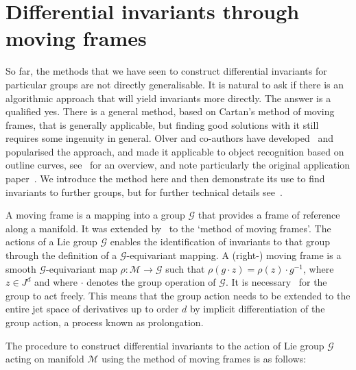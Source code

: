 \documentclass{artjlt}
\begin{document}
\section{Differential invariants through moving frames}\label{sec:movingframes}

So far, the methods that we have seen to construct differential invariants for particular groups are not directly generalisable. It is natural to ask if there is an algorithmic approach that will yield invariants more directly. The answer is a qualified yes. There is a general method, based on Cartan's method of moving frames, that is generally applicable, but finding good solutions with it still requires some ingenuity in general. Olver and co-authors have developed~\cite{Fels1999} and popularised the approach, and made it applicable to object recognition based on outline curves, see~\citet{Olver2005} for an overview, and note particularly the original application paper~\citep{Calabi1998}.  We introduce the method here and then demonstrate its use to find invariants to further groups, but for further technical details see~\citet{OlverCIT}. 

A moving frame is a mapping into a group $\mathcal{G}$ that provides a frame of reference along a manifold.  It was extended by~\citet{Cartan35} to the `method of moving frames'. The actions of a Lie group $\mathcal{G}$ enables the identification of invariants to that group through the definition of a $\mathcal{G}$-equivariant mapping. A (right-) moving frame is a smooth $\mathcal{G}$-equivariant map $\rho : \mathcal{M} \to \mathcal{G}$ such that $\rho (g \cdot z) = \rho(z) \cdot g^{-1}$, where $z \in J^d$ and where $\cdot$ denotes the group operation of $\mathcal{G}$. It is necessary~\citep{Olver2013} for the group to act freely. This means that the group action needs to be extended to the entire jet space of derivatives up to order $d$ by implicit differentiation of the group action, a process known as prolongation.

The procedure to construct differential invariants to the action of Lie group $\mathcal{G}$ acting on manifold $\mathcal{M}$ using the method of moving frames is as follows:
\end{document}
